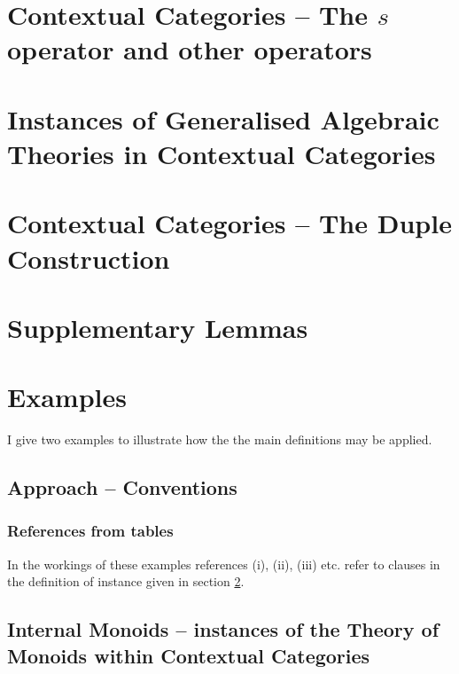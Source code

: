 \documentclass[10pt,a4paper]{article}
\theoremstyle{remark}
\begin{document}
\section{Contextual Categories -- The $s$ operator and other operators}

\fi
\section{Instances of Generalised Algebraic Theories in Contextual Categories}
\label{sectioninwhichinstanceisdefined}


\iffalse

\section{Contextual Categories -- The Duple Construction}
\label{contextualnotationparttwo}


\section{Supplementary Lemmas}


\section{Examples}
\label{examples}
I give two examples to illustrate how the the main definitions may be applied. 
\subsection{Approach -- Conventions}


\subsubsection{References from tables}

In the workings of these examples references (i), (ii), (iii) etc. refer to clauses in the  definition of instance given in 
section \ref{sectioninwhichinstanceisdefined}.

\subsection{Internal Monoids -- instances of the Theory of Monoids within Contextual Categories}
\label{monoidsinstanceexample} 
 
\end{document}

